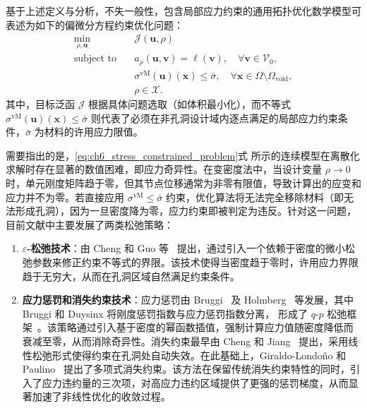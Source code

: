 基于上述定义与分析，不失一般性，包含局部应力约束的通用拓扑优化数学模型可表述为如下的偏微分方程约束优化问题：
\begin{equation} 
	\begin{aligned}
		\min_{\rho,\boldsymbol{u}}\quad&\mathcal{J}(\boldsymbol{u}, \rho)\\
		\text{subject~to}\quad&
		a_\rho(\boldsymbol{u},\boldsymbol{v}) = \ell(\boldsymbol{v}),\quad\forall\boldsymbol{v}\in\mathcal{V}_0,\\
		&\sigma^{\text{vM}}(\boldsymbol{u})(\boldsymbol{x}) \le \bar{\sigma}, \quad \forall \boldsymbol{x} \in \Omega \setminus \Omega_{\text{void}},\\
		&\rho\in\mathcal{X}.
	\end{aligned}
	\label{eq:ch6_stress_constrained_problem}
\end{equation}
其中，目标泛函 $\mathcal{J}$ 根据具体问题选取（如体积最小化），而不等式 $\sigma^{\text{vM}}(\boldsymbol{u})(\boldsymbol{x}) \le \bar{\sigma}$ 则代表了必须在非孔洞设计域内逐点满足的局部应力约束条件，$\bar{\sigma}$ 为材料的许用应力限值。

需要指出的是，\eqref{eq:ch6_stress_constrained_problem}式 所示的连续模型在离散化求解时存在显著的数值困难，即应力奇异性。在变密度法中，当设计变量 $\rho \to 0$ 时，单元刚度矩阵趋于零，但其节点位移通常为非零有限值，导致计算出的应变和应力并不为零。若直接应用 $\sigma^{\text{vM}} \le \bar{\sigma}$ 约束，优化算法将无法完全移除材料（即无法形成孔洞），因为一旦密度降为零，应力约束即被判定为违反。针对这一问题，目前文献中主要发展了两类松弛策略：

\begin{enumerate}
	\item \textbf{$\varepsilon$-松弛技术}：由 Cheng 和 Guo 等~\cite{chengErelaxedApproachStructural1997} 提出，通过引入一个依赖于密度的微小松弛参数来修正约束不等式的界限。该技术使得当密度趋于零时，许用应力界限趋于无穷大，从而在孔洞区域自然满足约束条件。
	
	\item \textbf{应力惩罚和消失约束技术}：应力惩罚由 Bruggi~\cite{bruggiAlternativeApproachStress2008a} 及 Holmberg~\cite{holmbergStressConstrainedTopology2013a} 等发展，其中 Bruggi 和 Duysinx 将刚度惩罚指数与应力惩罚指数分离，
	形成了 $q\text{-}p$ 松弛框架~\cite{bruggiTopologyOptimizationMinimum2012}。该策略通过引入基于密度的幂函数插值，强制计算应力值随密度降低而衰减至零，从而消除奇异性。消失约束最早由 Cheng 和 Jiang~\cite{chengStudyTopologyOptimization1992} 提出，采用线性松弛形式使得约束在孔洞处自动失效。在此基础上，Giraldo-Londoño 和 Paulino~\cite{giraldo-londonoUnifiedApproachTopology2020} 提出了多项式消失约束。该方法在保留传统消失约束特性的同时，引入了应力违约量的三次项，对高应力违约区域提供了更强的惩罚梯度，从而显著加速了非线性优化的收敛过程。
\end{enumerate}

